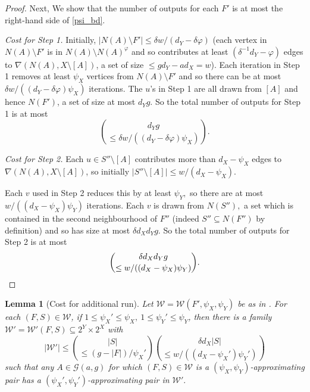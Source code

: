 \documentclass[a4paper]{amsart}
\newtheorem{lem}[thm]{Lemma}
\theoremstyle{definition}
\newcommand{\cG}{\mathcal{G} }
\newcommand{\cW}{\mathcal{W} }
\newcommand{\beq}[1]{\begin{equation}\label{#1}}
\newcommand{\enq}[0]{\end{equation}}
\newcommand{\nin}[0]{\noindent}
\newcommand{\sub}[0]{\subseteq}
\newcommand{\0}[0]{\emptyset}
\begin{document}
\begin{proof}
    Next, We show that the number of outputs for each $F'$ is at most the right-hand side of \eqref{psi_bd}. 

    \nin \textit{Cost for Step 1.} Initially, $|N(A) \setminus F'| \le \delta w/(d_Y-\delta\varphi)$ (each vertex in $N(A) \setminus F'$ is in $N(A) \setminus N(A)^\varphi$ and so contributes at least $(\delta^{-1}d_Y-\varphi)$ edges to $\nabla(N(A), X \setminus [A])$, a set of size $\leq gd_Y-ad_X=w$). Each iteration in Step 1 removes at least $\psi_X$ vertices from $N(A) \setminus F'$ and so there can be at most $\delta w/((d_Y-\delta\varphi)\psi_X)$ iterations. The $u$'s in Step 1 are all drawn from $[A]$ and hence $N(F')$, a set of size at most $d_Yg$. So the total number of outputs for Step 1 is at most \[{d_Yg \choose \le \delta w/((d_Y-\delta\varphi)\psi_X)}.\]

    \nin \textit{Cost for Step 2.} Each $u \in S'' \setminus [A]$ contributes more than $d_X-\psi_X$ edges to $\nabla(N(A), X \setminus [A])$, so initially $|S'' \setminus [A]| \le w/(d_X-\psi_X).$
    
    Each $v$ used in Step 2 reduces this by at least $\psi_Y,$ so there are at most $w/((d_X-\psi_X)\psi_Y)$ iterations. Each $v$ is drawn from $N(S''),$ a set which is contained in the second neighbourhood of $F''$ (indeed $S''\subseteq N(F'')$ by definition) and so has size at most $\delta d_Xd_Y g.$ So the total number of outputs for Step 2 is at most
    \[{\delta d_X d_Y g \choose \le w/((d_X-\psi_X)\psi_Y)}. \qedhere \]
\end{proof}

\begin{lem}[Cost for additional run]\label{lem.heart} Let $\cW=\cW(F', \psi_X, \psi_Y)$ be as in .
    For each $(F,S) \in \cW$, if $1 \le \psi_X'\leq \psi_X, \ 1\leq \psi_Y' \le \psi_Y$, then there is a family $\cW'=\cW'(F,S) \sub 2^Y \times 2^X$ with
    \beq{psi'_bd}|\cW'|\le {|S| \choose \le (g-|F|)/\psi_X'}{\delta d_X|S| \choose \le w/((d_X-\psi_X')\psi_Y')}\enq
    such that any $A \in \cG(a,g)$ for which $(F,S)\in \cW$ is a $(\psi_X, \psi_Y)$-approximating pair has a $(\psi_X', \psi_Y')$-approximating pair in $\cW'.$
\end{lem}
\end{document}
